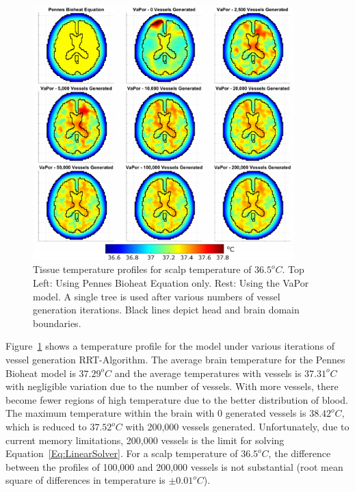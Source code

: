 \documentclass[11pt,english,a4paper,twoside,openright]{report}
\begin{document}
{{{{{{{{\begin{figure}[t]
	\centering
	\includegraphics[width=0.9\textwidth]{Chapter3/TissueTemperatures}
	\caption[Tissue temperature profiles for scalp temperature of $36.5^{o}C$ using Pennes Bioheat Equation and the VaPor model at various levels of vessel generation]{Tissue temperature profiles for scalp temperature of $36.5^{o}C$. Top Left: Using Pennes Bioheat Equation only. Rest: Using the VaPor model. A single tree is used after various numbers of vessel generation iterations. Black lines depict head and brain domain boundaries.}
	\label{fig:TissueTemperatures}
\end{figure}

Figure~\ref{fig:TissueTemperatures} shows a temperature profile for the model under various iterations of vessel generation RRT-Algorithm. The average brain temperature for the Pennes Bioheat model is $37.29^{o}C$ and the average temperatures with vessels is $37.31^{o}C$ with negligible variation due to the number of vessels. With more vessels, there become fewer regions of high temperature due to the better distribution of blood. The maximum temperature within the brain with 0 generated vessels is $38.42^{o}C$, which is reduced to $37.52^{o}C$ with 200,000 vessels generated. Unfortunately, due to current memory limitations, 200,000 vessels is the limit for solving Equation~\ref{Eq:LinearSolver}. For a scalp temperature of $36.5^{o}C$, the difference between the profiles of 100,000 and 200,000 vessels is not substantial (root mean square of differences in temperature is $\pm0.01^{o}C$).  

}}}}}}}}
\end{document}
